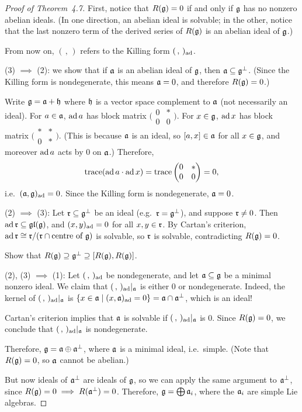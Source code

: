 \begin{proof}[Proof of Theorem~4.7]
First, notice that $R(\mathfrak{g}) = 0$ if and only if $\mathfrak{g}$ has no nonzero abelian
ideals. (In one direction, an abelian ideal is solvable; in the other, notice
that the last nonzero term of the derived series of $R(\mathfrak{g})$ is an abelian
ideal of $\mathfrak{g}$.)

From now on, $(\,,\,)$ refers to the Killing form $(\,,\,)_{\operatorname{ad}}$.

(3) $\implies$ (2): we show that if $\mathfrak{a}$ is an abelian ideal of $\mathfrak{g}$, then
$\mathfrak{a} \subseteq \mathfrak{g}^\perp$. (Since the Killing form is nondegenerate, this means
$\mathfrak{a} = 0$, and therefore $R(\mathfrak{g}) = 0$.)

Write $\mathfrak{g} = \mathfrak{a} + \mathfrak{h}$ where $\mathfrak{h}$ is a vector space complement to $\mathfrak{a}$ (not
necessarily an ideal). For $a \in \mathfrak{a}$, $\operatorname{ad} a$ has block matrix
$\bigl(\begin{smallmatrix} 0 & * \\ 0 & 0 \end{smallmatrix}\bigr)$. For
$x \in \mathfrak{g}$, $\operatorname{ad} x$ has block matrix
$\bigl(\begin{smallmatrix} * & * \\ 0 & * \end{smallmatrix}\bigr)$. (This is
because $\mathfrak{a}$ is an ideal, so $[a, x] \in \mathfrak{a}$ for all $x \in \mathfrak{g}$, and moreover
$\operatorname{ad} a$ acts by $0$ on $\mathfrak{a}$.) Therefore,
\[
  \operatorname{trace}(\operatorname{ad} a \cdot \operatorname{ad} x) = \operatorname{trace} \begin{pmatrix} 0 & * \\ 0 & 0 \end{pmatrix} = 0,
\]
i.e.\ $(\mathfrak{a}, \mathfrak{g})_{\operatorname{ad}} = 0$. Since the Killing form is nondegenerate, $\mathfrak{a} = 0$.

(2) $\implies$ (3): Let $\mathfrak{r} \subseteq \mathfrak{g}^\perp$ be an ideal (e.g.\
$\mathfrak{r} = \mathfrak{g}^\perp$), and suppose $\mathfrak{r} \neq 0$. Then $\operatorname{ad} \mathfrak{r} \subseteq \mathfrak{gl}(\mathfrak{g})$,
and $(x, y)_{\operatorname{ad}} = 0$ for all $x, y \in \mathfrak{r}$. By Cartan's criterion,
$\operatorname{ad} \mathfrak{r} \cong \mathfrak{r}/(\mathfrak{r} \cap \text{centre of } \mathfrak{g})$ is solvable, so $\mathfrak{r}$ is
solvable, contradicting $R(\mathfrak{g}) = 0$.

\begin{exercise}
Show that $R(\mathfrak{g}) \supseteq \mathfrak{g}^\perp \supseteq [R(\mathfrak{g}), R(\mathfrak{g})]$.
\end{exercise}

(2), (3) $\implies$ (1): Let $(\,,\,)_{\operatorname{ad}}$ be nondegenerate, and let
$\mathfrak{a} \subseteq \mathfrak{g}$ be a minimal nonzero ideal. We claim that
$(\,,\,)_{\operatorname{ad}}|_{\mathfrak{a}}$ is either $0$ or nondegenerate. Indeed, the kernel of
$(\,,\,)_{\operatorname{ad}}|_{\mathfrak{a}}$ is
$\{x \in \mathfrak{a} \mid (x, \mathfrak{a})_{\operatorname{ad}} = 0\} = \mathfrak{a} \cap \mathfrak{a}^\perp$, which is an ideal!

Cartan's criterion implies that $\mathfrak{a}$ is solvable if $(\,,\,)_{\operatorname{ad}}|_{\mathfrak{a}}$ is
$0$. Since $R(\mathfrak{g}) = 0$, we conclude that $(\,,\,)_{\operatorname{ad}}|_{\mathfrak{a}}$ is
nondegenerate.

Therefore, $\mathfrak{g} = \mathfrak{a} \oplus \mathfrak{a}^\perp$, where $\mathfrak{a}$ is a minimal ideal, i.e.\
simple. (Note that $R(\mathfrak{g}) = 0$, so $\mathfrak{a}$ cannot be abelian.)

But now ideals of $\mathfrak{a}^\perp$ are ideals of $\mathfrak{g}$, so we can apply the same
argument to $\mathfrak{a}^\perp$, since $R(\mathfrak{g}) = 0 \implies R(\mathfrak{a}^\perp) = 0$.
Therefore, $\mathfrak{g} = \bigoplus \mathfrak{a}_i$, where the $\mathfrak{a}_i$ are simple Lie algebras.
\end{proof}

